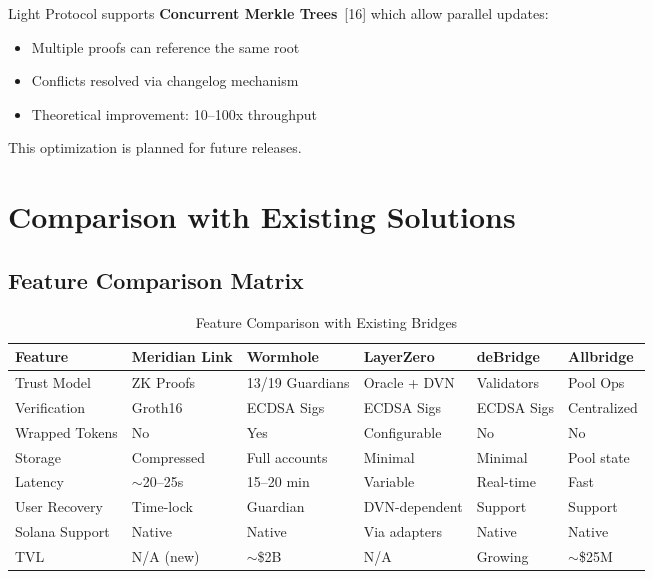 \documentclass[11pt,a4paper,twoside]{article}
\begin{document}
Light Protocol supports \textbf{Concurrent Merkle Trees}~[16] which allow parallel updates:
\begin{itemize}
    \item Multiple proofs can reference the same root
    \item Conflicts resolved via changelog mechanism
    \item Theoretical improvement: 10--100x throughput
\end{itemize}

This optimization is planned for future releases.

\section{Comparison with Existing Solutions}
\label{sec:comparison}

\subsection{Feature Comparison Matrix}

\begin{table}[H]
\centering
\caption{Feature Comparison with Existing Bridges}
\label{tab:comparison}
\small
\begin{tabular}{@{}llllll@{}}
\toprule
\textbf{Feature} & \textbf{Meridian Link} & \textbf{Wormhole} & \textbf{LayerZero} & \textbf{deBridge} & \textbf{Allbridge} \\
\midrule
Trust Model & ZK Proofs & 13/19 Guardians & Oracle + DVN & Validators & Pool Ops \\
Verification & Groth16 & ECDSA Sigs & ECDSA Sigs & ECDSA Sigs & Centralized \\
Wrapped Tokens & No & Yes & Configurable & No & No \\
Storage & Compressed & Full accounts & Minimal & Minimal & Pool state \\
Latency & $\sim$20--25s & 15--20 min & Variable & Real-time & Fast \\
User Recovery & Time-lock & Guardian & DVN-dependent & Support & Support \\
Solana Support & Native & Native & Via adapters & Native & Native \\
TVL & N/A (new) & $\sim$\$2B & N/A & Growing & $\sim$\$25M \\
\bottomrule
\end{tabular}
\end{table}
\end{document}
